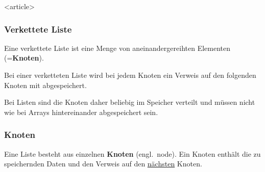 \begin{multicols}{2}

\begin{frame}<article>
\frametitle<presentation>{Verkettete Liste}

%
Eine verkettete Liste ist eine Menge von aneinandergereihten Elementen (=\textbf{Knoten}). 
%
\pause%
\begin{fact}
Bei einer verketteten Liste wird bei jedem Knoten ein Verweis auf den folgenden Knoten mit abgespeichert. 
\end{fact}
%
Bei Listen sind die Knoten daher beliebig im Speicher verteilt und müssen nicht wie bei Arrays hintereinander abgespeichert sein.

\end{frame}

\begin{frame}[fragile]
\frametitle<presentation>{Knoten}

\begin{definition}
Eine Liste besteht aus einzelnen \textbf{Knoten} (engl.\ node).
Ein Knoten enthält die zu speichernden Daten und den Verweis auf den \uline{nächsten} Knoten.
\end{definition}

\pause%

\begin{center}
\end{center}
\end{frame}
\end{multicols}
